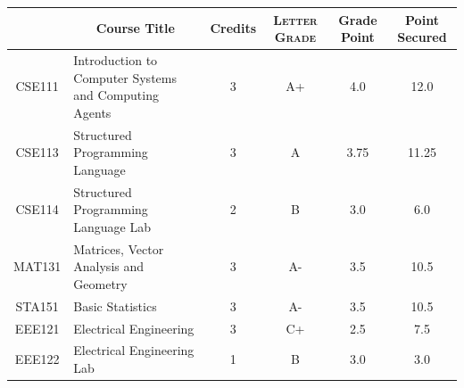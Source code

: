 \documentclass[11pt]{article}
\newcommand*{\numtwo}[1]{\pgfmathprintnumber[
                    fixed, precision=2, fixed zerofill=true]{#1}}
\begin{document}
                \begin{center}
                    \renewcommand{\arraystretch}{1.08}
                    
                \begin{tabular}{|c|l|c|>{\scshape}c|c|c|}
                \hline  \rule[-1ex]{0pt}{3.5ex} {\centering{\bf Course Code}} &  \multicolumn{1}{c|}{\textbf{Course Title}}  & {\bf Credits} & {\bf Letter Grade} & {\bf Grade Point} & {\bf Point Secured}  \\ 
                \hline   CSE111 &  Introduction to Computer Systems and Computing Agents		 & 3 & A+ & 4.0 & 12.0 \\ %
                \hline   CSE113 &  Structured Programming Language		 & 3 & A & 3.75 & 11.25 \\ %
                \hline   CSE114 &  Structured Programming Language Lab		 & 2 & B & 3.0 & 6.0 \\ %
                \hline   MAT131 &  Matrices, Vector Analysis and Geometry		 & 3 & A- & 3.5 & 10.5 \\ %
                \hline   STA151 &  Basic Statistics		 & 3 & A- & 3.5 & 10.5 \\ %
                \hline   EEE121 &  Electrical Engineering		 & 3 & C+ & 2.5 & 7.5 \\ %
                \hline   EEE122 &  Electrical Engineering Lab		 & 1 & B & 3.0 & 3.0 \\ %

\hline                %
                \end{tabular}
                \end{center}
                \renewcommand{\arraystretch}{1.03}
\end{document}
